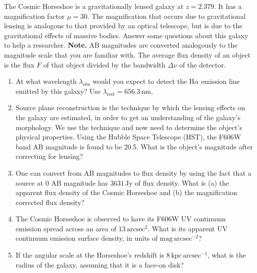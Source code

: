 The Cosmic Horseshoe is a gravitationally lensed galaxy at $z=2.379$. It has a magnification factor $\mu=30$. The magnification that occurs due to gravitational lensing is analogous to that provided by an optical telescope, but is due to the gravitational effects of massive bodies. Answer some questions about this galaxy to help a researcher.
\textbf{Note.} AB magnitudes are converted analogously to the magnitude scale that you are familiar with. The average flux density of an object is the flux $F$ of that object divided by the bandwidth $\Delta\nu$ of the detector.
\begin{enumerate}
\item At what wavelength $\lambda_{\mathrm{obs}}$ would you expect to detect the H$\alpha$ emission line emitted by this galaxy? Use $\lambda_{\mathrm{rest}}=656.3\,\mathrm{nm}$.
\item Source plane reconstruction is the technique by which the lensing effects on the galaxy are estimated, in order to get an understanding of the galaxy's morphology. We use the technique and now need to determine the object's physical properties. Using the Hubble Space Telescope (HST), the F606W band AB magnitude is found to be 20.5. What is the object's magnitude after correcting for lensing?
\item One can convert from AB magnitudes to flux density by using the fact that a source at 0 AB magnitude has $3631\,\mathrm{Jy}$ of flux density. What is (a) the apparent flux density of the Cosmic Horseshoe and (b) the magnification corrected flux density?
\item The Cosmic Horseshoe is observed to have its F606W UV continuum emission spread across an area of $13\,\mathrm{arcsec^2}$. What is its apparent UV continuum emission surface density, in units of $\mathrm{mag\,arcsec^{-2}}$?
\item If the angular scale at the Horseshoe's redshift is $8\,\mathrm{kpc\,arcsec^{-1}}$, what is the radius of the galaxy, assuming that it is a face-on disk?
\end{enumerate}
